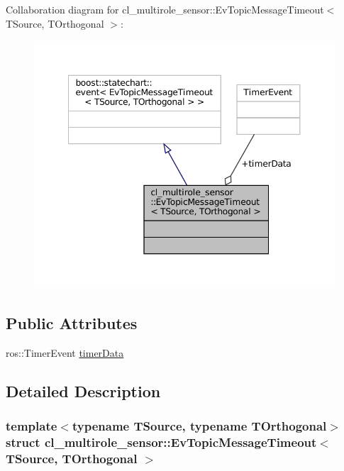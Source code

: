 Collaboration diagram for cl\+\_\+multirole\+\_\+sensor\+:\+:Ev\+Topic\+Message\+Timeout$<$ T\+Source, T\+Orthogonal $>$\+:
\nopagebreak
\begin{figure}[H]
\begin{center}
\leavevmode
\includegraphics[width=348pt]{structcl__multirole__sensor_1_1EvTopicMessageTimeout__coll__graph}
\end{center}
\end{figure}
\subsection*{Public Attributes}
\begin{DoxyCompactItemize}
\item 
ros\+::\+Timer\+Event \hyperlink{structcl__multirole__sensor_1_1EvTopicMessageTimeout_a56efab3b763d32bdd89ca9d737ab55dc}{timer\+Data}
\end{DoxyCompactItemize}


\subsection{Detailed Description}
\subsubsection*{template$<$typename T\+Source, typename T\+Orthogonal$>$\newline
struct cl\+\_\+multirole\+\_\+sensor\+::\+Ev\+Topic\+Message\+Timeout$<$ T\+Source, T\+Orthogonal $>$}



